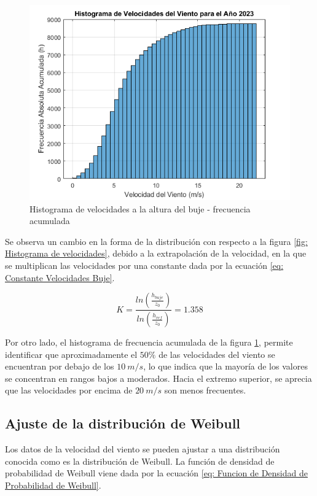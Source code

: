 \documentclass{IEEEtran}
\begin{document}
\begin{figure}[h]
    \centering
    \includegraphics[width = 0.5 \textwidth]{Imagenes/Histograma de Velocidades Buje Frec Acumulada.png}
    \caption{Histograma de velocidades a la altura del buje - frecuencia acumulada}
    \label{fig: Histograma de velocidades Frecuencia Acumulada Buje}
\end{figure}

Se observa un cambio en la forma de la distribución con respecto a la figura \ref{fig: Histograma de velocidades}, debido a la extrapolación de la velocidad, en la que se multiplican las velocidades por una constante dada por la ecuación \ref{eq: Constante Velocidades Buje}.

\begin{equation}
    K = \frac{ln \left( \frac{h_{buje}}{z_0} \right)}{ln \left( \frac{h_{ref}}{z_0} \right)} = 1.358
    \label{eq: Constante Velocidades Buje}
\end{equation}

Por otro lado, el histograma de frecuencia acumulada de la figura \ref{fig: Histograma de velocidades Frecuencia Acumulada Buje}, permite identificar que aproximadamente el $50\%$ de las velocidades del viento se encuentran por debajo de los $10\ m/s$, lo que indica que la mayoría de los valores se concentran en rangos bajos a moderados. Hacia el extremo superior, se aprecia que las velocidades por encima de $20\ m/s$ son menos frecuentes. 

\subsection{Ajuste de la distribución de Weibull}

Los datos de la velocidad del viento se pueden ajustar a una distribución conocida como es la distribución de Weibull. La función de densidad de probabilidad de Weibull viene dada por la ecuación \ref{eq: Funcion de Densidad de Probabilidad de Weibull}.
\end{document}
